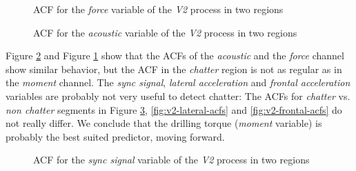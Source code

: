 \documentclass[12 pt]{scrartcl}
\begin{document}
\begin{figure}[p]
  \caption{ACF for the \emph{force} variable of the \emph{V2} process in two regions}
  \label{fig:v2-force-acfs}
\end{figure}


\begin{figure}[p]
  \caption{ACF for the \emph{acoustic} variable of the \emph{V2} process in two regions}
  \label{fig:v2-acoustic-acfs}
\end{figure}

Figure \ref{fig:v2-acoustic-acfs} and  Figure \ref{fig:v2-force-acfs} show that the ACFs of the \emph{acoustic} and the \emph{force} channel show similar behavior, but the ACF in the \emph{chatter} region is not as regular as in the \emph{moment} channel. The \emph{sync signal},
\emph{lateral acceleration} and \emph{frontal acceleration} variables are probably not very useful to detect chatter: The ACFs for \emph{chatter} vs. \emph{non chatter} segments in Figure \ref{fig:v2-sync-acfs}, \ref{fig:v2-lateral-acfs} and \ref{fig:v2-frontal-acfs} do not really differ. We conclude that the drilling torque (\emph{moment} variable) is probably the best suited predictor, moving forward.


\begin{figure}[p]
  \caption{ACF for the \emph{sync signal} variable of the \emph{V2} process in two regions}
  \label{fig:v2-sync-acfs}
\end{figure}
\end{document}
